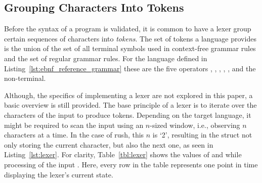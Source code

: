 \subsection{Grouping Characters Into Tokens}

Before the syntax of a program is validated, it is common to have a lexer group certain sequences of characters into \emph{tokens}.
The set of tokens a language provides is the union of the set of all terminal symbols used in context-free grammar rules and the set of regular grammar rules.
For the language defined in Listing~\ref{lst:ebnf_reference_grammar} these are the five operators \qVerb{+}, \qVerb{-}, \qVerb{*}, \qVerb{/}, \qVerb{**}, and the  non-terminal.


Although, the specifics of implementing a lexer are not explored in this paper, a basic overview is still provided.
The base principle of a lexer is to iterate over the characters of the input to produce tokens.
Depending on the target language, it might be required to scan the input using an $n$-sized window, i.e., observing $n$ characters at a time.
In the case of rush, this $n$ is `2', resulting in the  struct not only storing the current character, but also the next one, as seen in Listing~\ref{lst:lexer}.
For clarity, Table~\ref{tbl:lexer} shows the values of  and  while processing of the input .
Here, every row in the table represents one point in time displaying the lexer's current state.

